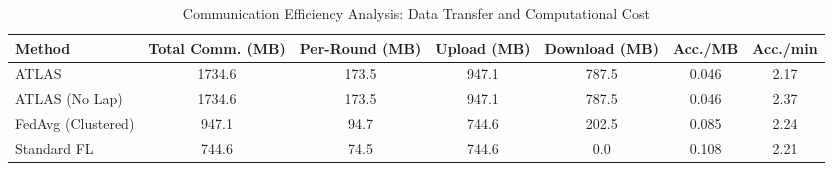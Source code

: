 \begin{table}[!t]
\renewcommand{\arraystretch}{1.2}
\caption{Communication Efficiency Analysis: Data Transfer and Computational Cost}
\label{tab:communication}
\centering
\begin{tabular}{l|cc|cc|cc}
\hline\hline
Method & Total Comm. (MB) & Per-Round (MB) & Upload (MB) & Download (MB) & Acc./MB & Acc./min \\
\hline
ATLAS & 1734.6 & 173.5 & 947.1 & 787.5 & 0.046 & 2.17 \\
ATLAS (No Lap) & 1734.6 & 173.5 & 947.1 & 787.5 & 0.046 & 2.37 \\
FedAvg (Clustered) & 947.1 & 94.7 & 744.6 & 202.5 & 0.085 & 2.24 \\
Standard FL & 744.6 & 74.5 & 744.6 & 0.0 & 0.108 & 2.21 \\
\hline\hline
\end{tabular}
\end{table}
